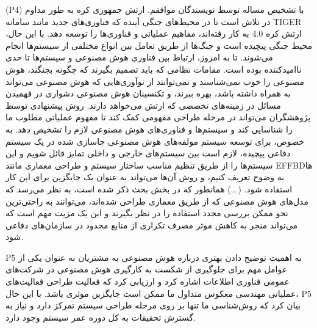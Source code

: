 \documentclass[a4paper,10pt]{article}
\begin{document}
                    \begin{addinfo}
                        
                        (P4) با تشخیص مساله توسط نویسندگان موافقم. ارتش جمهوری کره به طور مداوم در تلاش است تا در محیط‌های جنگی آینده که فناوری‌های جدید مانند سامانه TIGER ارتش کره 4.0 به کار رفته‌اند، مفاهیم عملیاتی و فناوری‌ها را توسعه دهد. با این حال، محیط جنگی پیچیده است و جنگ‌ها از طریق تعامل بین انواع مختلفی از سیستم‌ها انجام می‌شوند. تا به امروز، ارتباط بین فناوری هوش مصنوعی و سیستم‌ها تا حدی ناامیدکننده بوده است. مقامات نظامی که باید تصمیم بگیرند که چگونه بجنگند، هوش مصنوعی را خوب نمی‌شناسند و نمی‌توانند از نوآوری‌هایی که هوش مصنوعی می‌تواند به همراه داشته باشد، بهره ببرند، و تکنسینان هوش مصنوعی دشواری در فهمیدن مسائل در زمینه‌های تخصصی که ارتش می‌خواهد دارند. روش پیشنهادی توسط پژوهشگران می‌تواند در مرحله طراحی مفهومی کمک کند تا مفهوم عملیاتی مطلوب ما را شناسایی کند و سیستم‌ها و فناوری‌های هوش مصنوعی لازم را تشخیص دهد. به خصوص، برای توسعه سیستم مولفه‌های هوش مصنوعی جاسازی شده در یک سیستم دفاعی پیچیده، لازم است بین سیستم‌های خارجی و داخلی تمایز قائل شویم و این سیستم‌ها را از طریق تنظیم مناسب ساختار سیستم و طراحی معماری مانند EFFBDها به وضوح تعریف کنیم، و روش آن‌ها می‌تواند به عنوان یک جایگزین برای این کار استفاده شود. (...) همانطور که در بخش بحث ذکر شده است، به نظر می‌رسد که مدل‌های هوش مصنوعی که از طریق معماری طراحی شده‌اند، می‌توانند به راحتی‌ترین نحو ممکن بررسی مجدد استفاده را در نظر بگیرند و این یک مزیت مهم است که می‌تواند منجر به کاهش موثر مصرف تکراری از منابع محدود در سازمان‌های دفاعی شود.
                        
                    \end{addinfo}

                    P5 به اهمیت توضیح دادن بهتری درباره هوش مصنوعی به مشتریان به عنوان یکی از عوامل مهم برای جلوگیری از شکست به کارگیری هوش مصنوعی در شرکت‌های عمومی فناوری اطلاعات اشاره کرد و ارزیابی کرد که فعالیت طراحی فعالیت‌های عملیاتی مهندسی معکوس متداول ما ممکن است جایگزین موثری باشد. با این حال، P5 بیان کرد که روش‌شناسی ما تنها بر روی مرحله طراحی سیستم تمرکز دارد و نیاز به گسترش تحقیقات به کل دوره عمر سیستم وجود دارد.
\end{document}
